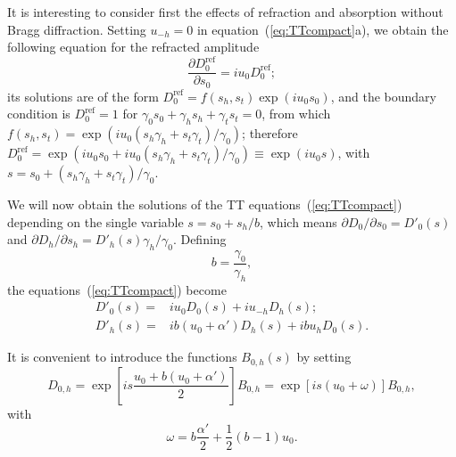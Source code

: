 \documentclass[preprint]{iucr}              %
\begin{document}
%

It is interesting to consider first the effects of refraction and absorption without Bragg diffraction. 
Setting $u_{-h}=0$ in equation~(\ref{eq:TTcompact}a), we obtain the following equation for the refracted amplitude 
\begin{equation}
\frac{\partial D_0^{\text{ref}}}{\partial s_0} = i u_0 D_0^{\text{ref}};
\end{equation}
its solutions are of the form $D_0^{\text{ref}}=f(s_h,s_t) \exp(i u_0 s_0)$, and the boundary condition is $D_0^{\text{ref}}=1$ for  $\gamma_0 s_0 + \gamma_h s_h + \gamma_t s_t=0$, from which $f(s_h,s_t)=\exp(i u_0 (s_h \gamma_h + s_t \gamma_t)/\gamma_0)$; therefore $D_0^{\text{ref}}= \exp(i u_0 s_0 + i u_0(s_h \gamma_h + s_t \gamma_t)/\gamma_0) \equiv \exp(i u_0 s)$, with $s=s_0+(s_h \gamma_h+s_t \gamma_t)/\gamma_0$.

We will now obtain the solutions of the TT equations~(\ref{eq:TTcompact}) depending on the single variable $s=s_0+s_h/b$, which means 
$\partial D_{0} / \partial  s_{0}=D'_{0}(s)$ and $\partial D_{h} / \partial s_{h}=D'_{h}(s)\gamma_h/\gamma_0$.
Defining 
\begin{equation}\label{eq:b}
b = \frac{\gamma_0}{\gamma_h},    
\end{equation}
the equations~(\ref{eq:TTcompact}) become
\begin{subequations}
\label{eq:TTlaue}
\begin{align}
D'_0(s) =& i u_0 D_0(s) + i u_{-h} D_h(s); \\
D'_h(s) =& i b (u_0 + \alpha') D_h(s) + i b u_{h} D_0(s).
\end{align}
\end{subequations}

It is convenient to introduce the functions $B_{0,h}(s)$ by setting
\begin{equation}
\label{eq:Bdefinition}
D_{0,h} = \exp \left[ i s \frac{u_0 + b (u_0+\alpha')}{2} \right] B_{0,h} = \exp[i s (u_0+\omega)] B_{0,h},  
\end{equation}
with
\begin{equation}\label{eq:omega}
    \omega=b \frac{\alpha'}{2}+ \frac{1}{2} (b-1) u_0.
\end{equation}
\end{document}
